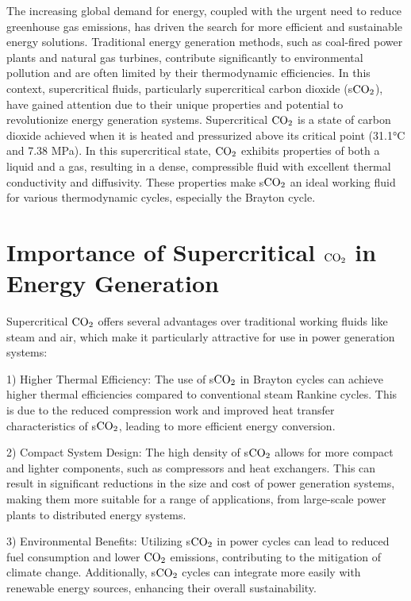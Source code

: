 
The increasing global demand for energy, coupled with the urgent need to reduce greenhouse gas emissions, has driven the search for more efficient and sustainable energy solutions. 
Traditional energy generation methods, such as coal-fired power plants and natural gas turbines, contribute significantly to environmental pollution and are often limited by their 
thermodynamic efficiencies. In this context, supercritical fluids, particularly supercritical carbon dioxide (s$\ce{CO2}$), have gained attention due to their unique properties and 
potential to revolutionize energy generation systems.
Supercritical $\ce{CO2}$ is a state of carbon dioxide achieved when it is heated and pressurized above its critical point (31.1°C and 7.38 MPa). 
In this supercritical state, $\ce{CO2}$ exhibits properties of both a liquid and a gas, resulting in a dense, compressible fluid with excellent thermal conductivity and diffusivity. 
These properties make s$\ce{CO2}$ an ideal working fluid for various thermodynamic cycles, especially the Brayton cycle.

\section*{Importance of Supercritical $\ce{CO2}$ in Energy Generation}

Supercritical $\ce{CO2}$ offers several advantages over traditional working fluids like steam and air, which make it particularly attractive for use in power generation systems:

1) Higher Thermal Efficiency: The use of s$\ce{CO2}$ in Brayton cycles can achieve higher thermal efficiencies compared to conventional steam Rankine cycles. This is due to the reduced compression work and improved heat transfer characteristics of s$\ce{CO2}$, leading to more efficient energy conversion.

2) Compact System Design: The high density of s$\ce{CO2}$ allows for more compact and lighter components, such as compressors and heat exchangers. This can result in significant reductions in the size and cost of power generation systems, making them more suitable for a range of applications, from large-scale power plants to distributed energy systems.

3) Environmental Benefits: Utilizing s$\ce{CO2}$ in power cycles can lead to reduced fuel consumption and lower $\ce{CO2}$ emissions, contributing to the mitigation of climate change. Additionally, s$\ce{CO2}$ cycles can integrate more easily with renewable energy sources, enhancing their overall sustainability.


